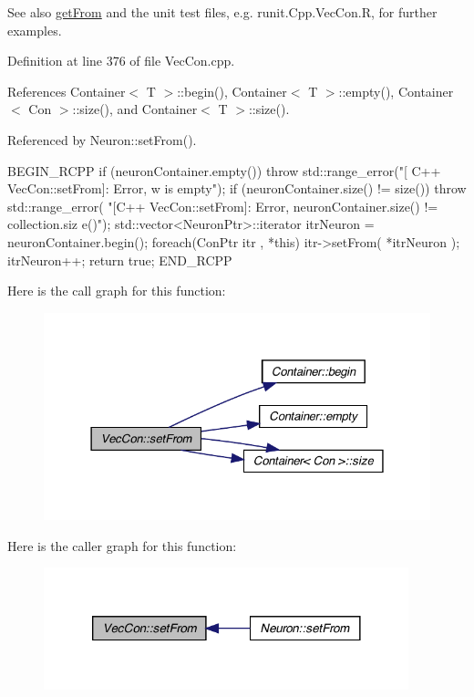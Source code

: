 \begin{DoxySeeAlso}{See also}
\hyperlink{class_vec_con_ad9dc02872d29a1a58f5079457c3f8001}{getFrom} and the unit test files, e.g. runit.Cpp.VecCon.R, for further examples. 
\end{DoxySeeAlso}


Definition at line 376 of file VecCon.cpp.



References Container$<$ T $>$::begin(), Container$<$ T $>$::empty(), Container$<$ Con $>$::size(), and Container$<$ T $>$::size().



Referenced by Neuron::setFrom().


\begin{DoxyCode}
{
  BEGIN_RCPP
  if (neuronContainer.empty())
    { throw std::range_error("[ C++ VecCon::setFrom]: Error, w is empty");}
  if (neuronContainer.size() != size())
    {
      throw std::range_error(
          "[C++ VecCon::setFrom]: Error, neuronContainer.size() != collection.siz
      e()");
    }
  std::vector<NeuronPtr>::iterator itrNeuron = neuronContainer.begin();
  foreach(ConPtr itr , *this)
    {
      itr->setFrom( *itrNeuron );
      itrNeuron++;
    }
  return true;
END_RCPP}
\end{DoxyCode}


Here is the call graph for this function:
\nopagebreak
\begin{figure}[H]
\begin{center}
\leavevmode
\includegraphics[width=328pt]{class_vec_con_a280ee1e24c44c8aeff1c4c4076322b71_cgraph}
\end{center}
\end{figure}




Here is the caller graph for this function:
\nopagebreak
\begin{figure}[H]
\begin{center}
\leavevmode
\includegraphics[width=300pt]{class_vec_con_a280ee1e24c44c8aeff1c4c4076322b71_icgraph}
\end{center}
\end{figure}


